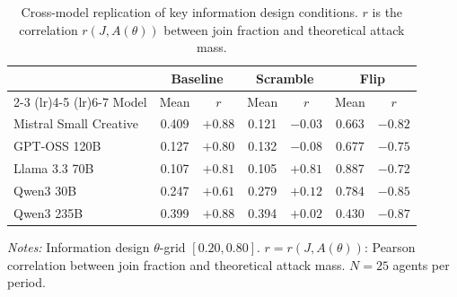 \begin{table}[t]
\centering
\caption{Cross-model replication of key information design conditions. $r$ is the correlation $r(J, A(\theta))$ between join fraction and theoretical attack mass.}
\label{tab:crossmodel}
\small
\begin{tabular}{lcccccc}
\toprule
& \multicolumn{2}{c}{Baseline} & \multicolumn{2}{c}{Scramble} & \multicolumn{2}{c}{Flip} \\
\cmidrule(lr){2-3} \cmidrule(lr){4-5} \cmidrule(lr){6-7}
Model & Mean & $r$ & Mean & $r$ & Mean & $r$ \\
\midrule
Mistral Small Creative & 0.409 & $+0.88$ & 0.121 & $-0.03$ & 0.663 & $-0.82$ \\
GPT-OSS 120B & 0.127 & $+0.80$ & 0.132 & $-0.08$ & 0.677 & $-0.75$ \\
Llama 3.3 70B & 0.107 & $+0.81$ & 0.105 & $+0.81$ & 0.887 & $-0.72$ \\
Qwen3 30B & 0.247 & $+0.61$ & 0.279 & $+0.12$ & 0.784 & $-0.85$ \\
Qwen3 235B & 0.399 & $+0.88$ & 0.394 & $+0.02$ & 0.430 & $-0.87$ \\
\bottomrule
\end{tabular}
\vspace{0.25em}
\parbox{\textwidth}{\footnotesize\emph{Notes:} Information design $\theta$-grid $[0.20, 0.80]$. $r = r(J, A(\theta))$: Pearson correlation between join fraction and theoretical attack mass. $N = 25$ agents per period.}
\end{table}
